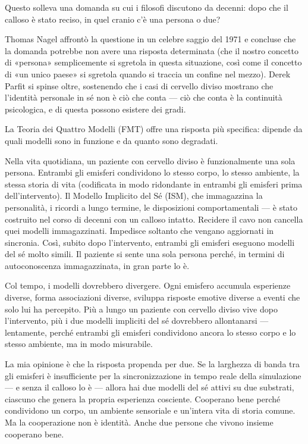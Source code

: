 \documentclass[11pt, twoside, openright]{book}
\begin{document}
Questo solleva una domanda su cui i filosofi discutono da decenni: dopo che il calloso è stato reciso, in quel cranio c'è una persona o due?

Thomas Nagel affrontò la questione in un celebre saggio del 1971 e concluse che la domanda potrebbe non avere una risposta determinata (che il nostro concetto di «persona» semplicemente si sgretola in questa situazione, così come il concetto di «un unico paese» si sgretola quando si traccia un confine nel mezzo). Derek Parfit si spinse oltre, sostenendo che i casi di cervello diviso mostrano che l'identità personale in sé non è ciò che conta --- ciò che conta è la continuità psicologica, e di questa possono esistere dei gradi.

La Teoria dei Quattro Modelli (FMT) offre una risposta più specifica: dipende da quali modelli sono in funzione e da quanto sono degradati.

Nella vita quotidiana, un paziente con cervello diviso è funzionalmente una sola persona. Entrambi gli emisferi condividono lo stesso corpo, lo stesso ambiente, la stessa storia di vita (codificata in modo ridondante in entrambi gli emisferi prima dell'intervento). Il Modello Implicito del Sé (ISM), che immagazzina la personalità, i ricordi a lungo termine, le disposizioni comportamentali --- è stato costruito nel corso di decenni con un calloso intatto. Recidere il cavo non cancella quei modelli immagazzinati. Impedisce soltanto che vengano aggiornati in sincronia. Così, subito dopo l'intervento, entrambi gli emisferi eseguono modelli del sé molto simili. Il paziente si sente una sola persona perché, in termini di autoconoscenza immagazzinata, in gran parte lo è.

Col tempo, i modelli dovrebbero divergere. Ogni emisfero accumula esperienze diverse, forma associazioni diverse, sviluppa risposte emotive diverse a eventi che solo lui ha percepito. Più a lungo un paziente con cervello diviso vive dopo l'intervento, più i due modelli impliciti del sé dovrebbero allontanarsi --- lentamente, perché entrambi gli emisferi condividono ancora lo stesso corpo e lo stesso ambiente, ma in modo misurabile.

La mia opinione è che la risposta propenda per due. Se la larghezza di banda tra gli emisferi è insufficiente per la sincronizzazione in tempo reale della simulazione --- e senza il calloso lo è --- allora hai due modelli del sé attivi su due substrati, ciascuno che genera la propria esperienza cosciente. Cooperano bene perché condividono un corpo, un ambiente sensoriale e un'intera vita di storia comune. Ma la cooperazione non è identità. Anche due persone che vivono insieme cooperano bene.
\end{document}
